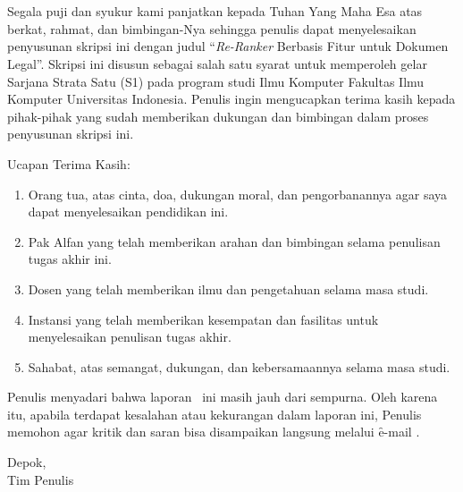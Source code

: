 \chapter*{\kataPengantar}
\pagestyle{first-pages}

Segala puji dan syukur kami panjatkan kepada Tuhan Yang Maha Esa atas berkat,
rahmat, dan bimbingan-Nya sehingga penulis dapat menyelesaikan penyusunan skripsi ini dengan judul ``\textit{Re-Ranker} Berbasis Fitur untuk \ir{} Dokumen Legal''. Skripsi ini disusun sebagai salah satu syarat untuk memperoleh gelar Sarjana Strata Satu (S1) pada program studi Ilmu Komputer Fakultas Ilmu Komputer Universitas Indonesia. Penulis ingin mengucapkan terima kasih kepada pihak-pihak yang sudah memberikan dukungan dan bimbingan dalam proses penyusunan skripsi ini.

Ucapan Terima Kasih:
\begin{enumerate}[topsep=0pt,itemsep=-1ex,partopsep=1ex,parsep=1ex]
	\item Orang tua, atas cinta, doa, dukungan moral, dan pengorbanannya agar saya dapat menyelesaikan pendidikan ini.
	\item Pak Alfan yang telah memberikan arahan dan bimbingan selama penulisan tugas akhir ini.
	\item Dosen yang telah memberikan ilmu dan pengetahuan selama masa studi.
	\item Instansi yang telah memberikan kesempatan dan fasilitas untuk menyelesaikan penulisan tugas akhir.
	\item Sahabat, atas semangat, dukungan, dan kebersamaannya selama masa studi.
\end{enumerate}

Penulis menyadari bahwa laporan \type~ini masih jauh dari sempurna. Oleh karena itu, apabila terdapat kesalahan atau kekurangan dalam laporan ini, Penulis memohon agar kritik dan saran bisa disampaikan langsung melalui \f{e-mail} .


\vspace*{0.1cm}
\begin{flushright}
Depok, \tanggalSiapSidang\\[0.1cm]
\ifx\blank\npmDua
	\vspace*{1.5cm}
	\penulisSatu
\else
	Tim Penulis
\fi

\end{flushright}
